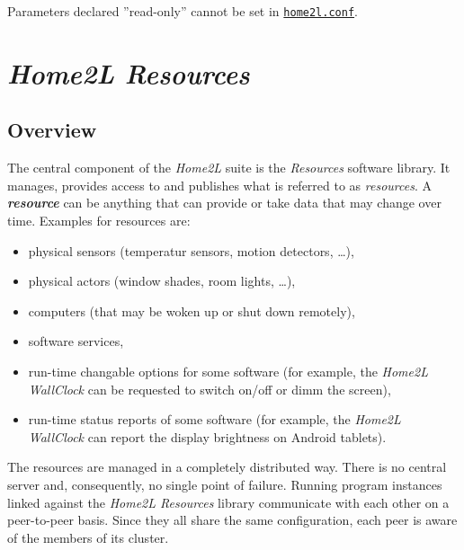 \documentclass[12pt,english,parskip=half,headheight=19pt]{scrreprt}
\newcommand{\idx}[1]{#1\index{#1}}
\newcommand{\reftool}[1]{\hyperref[tool:#1]{\texttt{\idx{#1}}}}
\begin{document}
Parameters declared ''read-only'' cannot be set in \reftool{home2l.conf}.








%
\chapter{\textit{Home2L Resources}}
\label{ch:resources}
%



\section{Overview}
\label{sec:resources-overview}


The central component of the \textit{Home2L} suite is the \textit{Resources}
software library. It manages, provides access to and publishes what is referred
to as \textit{resources}. A \textbf{\textit{resource}} can be anything that can
provide or take data that may change over time.
Examples for resources are:

\begin{itemize}
\item
  physical sensors (temperatur sensors, motion detectors, \ldots{}),
\item
  physical actors (window shades, room lights, \ldots{}),
\item
  computers (that may be woken up or shut down remotely),
\item
  software services,
\item
  run-time changable options for some software (for example, the
  \textit{Home2L WallClock} can be requested to switch on/off or dimm the
  screen),
\item
  run-time status reports of some software (for example, the
  \textit{Home2L WallClock} can report the display brightness on Android
  tablets).
\end{itemize}

The resources are managed in a completely distributed way. There is no
central server and, consequently, no single point of failure. Running
program instances linked against the \textit{Home2L Resources} library communicate
with each other on a peer-to-peer basis. Since they all share the same
configuration, each peer is aware of the members of its cluster.
\end{document}
